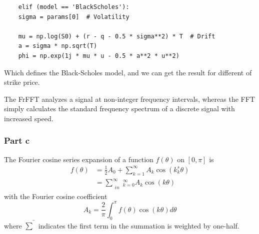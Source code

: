 \documentclass[margin=1in]{article}
\begin{document}
   \begin{lstlisting}
   	elif (model == 'BlackScholes'):
   	sigma = params[0]  # Volatility
   	
   	mu = np.log(S0) + (r - q - 0.5 * sigma**2) * T  # Drift
   	a = sigma * np.sqrt(T)  
   	phi = np.exp(1j * mu * u - 0.5 * a**2 * u**2) 
   \end{lstlisting} 

   Which defines the Black-Scholes model, and we can get the result for different of strike price. 


 \begin{table}[h!]
	\centering
	\caption{Results for Different Values of $K$}
\end{table}
	  

	  The FrFFT analyzes a signal at non-integer frequency intervals, whereas the FFT simply calculates the standard frequency spectrum of a discrete signal with increased speed.
	  
	  \subsubsection*{Part c}
	  
	  The Fourier cosine series expansion of a function $f(\theta)$ on $[0, \pi]$ is
	  $$
	  \begin{aligned}
	  	f(\theta) & =\frac{1}{2} A_{0}+\sum_{k=1}^{\infty} A_{k} \cos \left(k_{k}^{s} \theta\right) \\
	  	& =\sum_{\substack{i n}}^{\infty}{ }_{k=0}^{\infty} A_{k} \cos (k \theta)
	  \end{aligned}
	  $$
	  with the Fourier cosine coefficient
	  $$
	  A_{k}=\frac{2}{\pi} \int_{0}^{\pi} f(\theta) \cos (k \theta) d \theta
	  $$
	  where $\bar{\sum}$ indicates the first term in the summation is weighted by one-half.
	  
\end{document}
